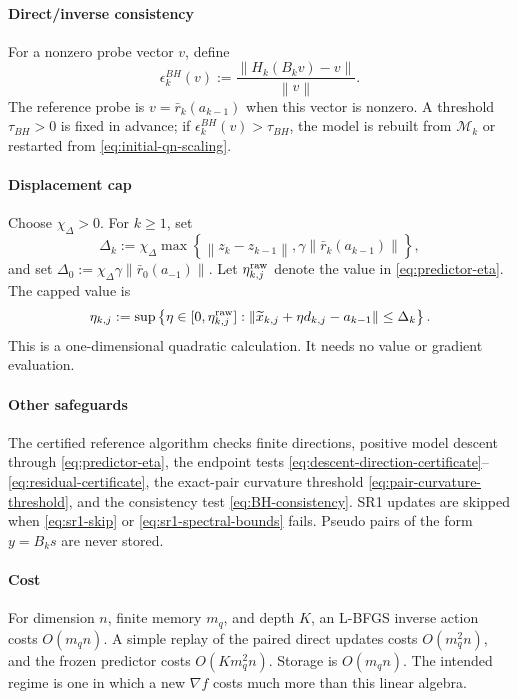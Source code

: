 \documentclass[10pt,leqno]{amsart}
\numberwithin{equation}{section}
\numberwithin{algorithm}{section}
\theoremstyle{remark}
\newcommand{\norm}[1]{\left\lVert #1 \right\rVert}
\newcommand{\grad}{\nabla}
\begin{document}
\paragraph{Direct/inverse consistency}
For a nonzero probe vector $v$, define
\begin{equation}
\label{eq:BH-consistency}
  \epsilon_k^{BH}(v)
  :=\frac{\norm{H_k(B_kv)-v}}{\norm{v}}.
\end{equation}
The reference probe is $v=\bar r_k(a_{k-1})$ when this vector is nonzero.  A threshold $\tau_{BH}>0$ is fixed in advance; if $\epsilon_k^{BH}(v)>\tau_{BH}$, the model is rebuilt from $\mathcal M_k$ or restarted from \eqref{eq:initial-qn-scaling}.

\paragraph{Displacement cap}
Choose $\chi_\Delta>0$.  For $k\ge1$, set
\begin{equation}
\label{eq:predictor-radius}
  \Delta_k:=\chi_\Delta
  \max\left\{\norm{z_k-z_{k-1}},
              \gamma\norm{\bar r_k(a_{k-1})}\right\},
\end{equation}
and set $\Delta_0:=\chi_\Delta\gamma\norm{\bar r_0(a_{-1})}$.  Let $\eta_{k,j}^{\rm raw}$ denote the value in \eqref{eq:predictor-eta}.  The capped value is
\begin{equation}
\label{eq:predictor-radius-cap}
  \eta_{k,j}:=
  \sup\left\{\eta\in[0,\eta_{k,j}^{\rm raw}]:
  \norm{\widetilde x_{k,j}+\eta d_{k,j}-a_{k-1}}\le\Delta_k\right\}.
\end{equation}
This is a one-dimensional quadratic calculation.  It needs no value or gradient evaluation.

\paragraph{Other safeguards}
The certified reference algorithm checks finite directions, positive model descent through \eqref{eq:predictor-eta}, the endpoint tests \eqref{eq:descent-direction-certificate}--\eqref{eq:residual-certificate}, the exact-pair curvature threshold \eqref{eq:pair-curvature-threshold}, and the consistency test \eqref{eq:BH-consistency}.  SR1 updates are skipped when \eqref{eq:sr1-skip} or \eqref{eq:sr1-spectral-bounds} fails.  Pseudo pairs of the form $y=B_ks$ are never stored.

\paragraph{Cost}
For dimension $n$, finite memory $m_q$, and depth $K$, an L-BFGS inverse action costs $O(m_qn)$.  A simple replay of the paired direct updates costs $O(m_q^2n)$, and the frozen predictor costs $O(Km_q^2n)$.  Storage is $O(m_qn)$.  The intended regime is one in which a new $\grad f$ costs much more than this linear algebra.
\end{document}
